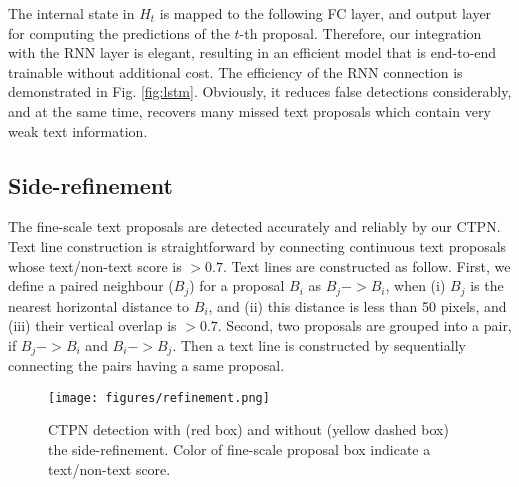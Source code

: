 \documentclass[runningheads]{llncs}
\begin{document}
The internal state in $H_t$ is mapped to the following FC layer, and output layer for computing the predictions of the $t$-th proposal. Therefore, our integration with the RNN layer is elegant, resulting in an efficient model that is end-to-end trainable without additional cost. The efficiency of the RNN connection is demonstrated in Fig. \ref{fig:lstm}. Obviously, it reduces false detections considerably, and at the same time,  recovers many missed text proposals which contain very weak text information.

\subsection{Side-refinement}
The fine-scale text proposals are detected accurately and reliably by our CTPN. Text line construction is straightforward by connecting continuous text proposals whose text/non-text score is $>0.7$. Text lines are constructed as follow. First, we define a paired neighbour ($B_j$) for a proposal $B_i$ as $B_j->B_i$, when  (i) $B_j$ is the nearest horizontal distance to $B_i$, and (ii) this distance is less than 50 pixels, and (iii) their vertical overlap is $>0.7$. Second, two proposals are grouped into a pair, if $B_j->B_i$ and $B_i->B_j$. Then a text line is constructed by sequentially connecting  the pairs  having a same proposal.


 \begin{figure}[tb]
\centering
\texttt{[image: figures/refinement.png]}
\caption{CTPN detection with (red box) and without (yellow dashed box) the side-refinement. Color of fine-scale proposal box indicate a text/non-text score.}
\label{fig:refinement}
\end{figure}
\end{document}
